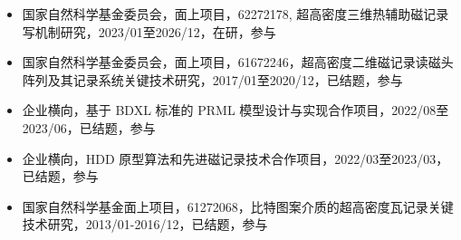 \documentclass[zh]{resume}
\begin{document}
\begin{itemize}
  \item 国家自然科学基金委员会，面上项目，62272178, 超高密度三维热辅助磁记录写机制研究，2023/01至2026/12，在研，参与
  \item 国家自然科学基金委员会，面上项目，61672246，超高密度二维磁记录读磁头阵列及其记录系统关键技术研究，2017/01至2020/12，已结题，参与
  \item 企业横向，基于 BDXL 标准的 PRML 模型设计与实现合作项目，2022/08至2023/06，已结题，参与
  \item 企业横向，HDD 原型算法和先进磁记录技术合作项目，2022/03至2023/03，已结题，参与
  \item 国家自然科学基金面上项目，61272068，比特图案介质的超高密度瓦记录关键技术研究，2013/01-2016/12，已结题，参与
\end{itemize}



{\onehalfspacing\hspace{2em}%
\nocite{*}

\par}
\end{document}
